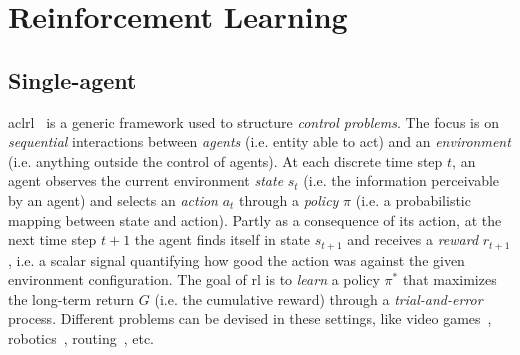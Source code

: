 \chapter{Reinforcement Learning}\label{chap:marl}
\newcommand{\RS}{\mathcal{S}}
\newcommand{\RA}{\mathcal{A}}
\newcommand{\RP}{\mathcal{P}}
\newcommand{\RR}{\mathcal{R}}
\newcommand{\RE}{\mathbb{E}}

\section{Single-agent}
acl{rl}~\cite{sutton2018reinforcement-learning} is a generic framework 
 used to structure \emph{control problems}. 
%
The focus is on \emph{sequential} interactions between \emph{agents}
 (i.e. entity able to act) and an \emph{environment} 
 (i.e. anything outside the control of agents). 
%
At each discrete time step $t$, an agent observes the current environment \emph{state} $s_t$ 
 (i.e. the information perceivable by an agent) and selects an \emph{action} $a_t$ through a \emph{policy} $\pi$ (i.e. a probabilistic mapping between state and action). 
%
Partly as a consequence of its action, at the next time step $t+1$ the agent finds itself in state $s_{t+1}$ and receives a \emph{reward} $r_{t+1}$, 
 i.e. a scalar signal quantifying how good the action was against the given environment configuration. 
%
The goal of \ac{rl} is to \emph{learn} a policy \emph{$\pi^*$} that maximizes the long-term return $G$ (i.e. the cumulative reward) through a \emph{trial-and-error} process. 
%
Different problems can be devised in these settings, like video games~\cite{DBLP:journals/spm/ArulkumaranDBB17}, robotics~\cite{DBLP:journals/ijrr/KoberBP13}, routing~\cite{DBLP:journals/comsur/LuongHGNWLK19}, etc.


